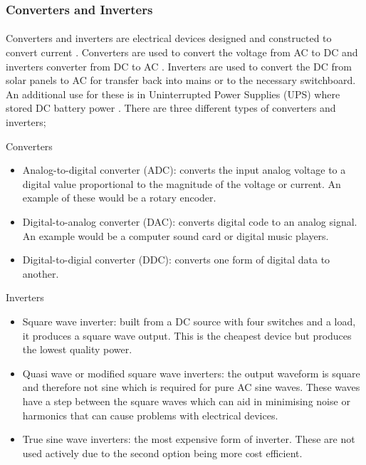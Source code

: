 \subsubsection{Converters and Inverters}

\paragraph{}
Converters and inverters are electrical devices designed and constructed to convert
current \cite{website:ConvVsInverter}. Converters are used to convert the voltage from AC to DC and inverters converter from DC to AC \cite{website:ConvVsInverter}. Inverters are used to convert the DC from solar panels to AC for transfer back into mains or to the necessary switchboard. An additional use for these is in Uninterrupted Power Supplies (UPS) where stored DC battery power \cite{website:ConvVsInverter}. There are three different types of converters and inverters;

Converters \cite{website:ConvVsInverter}
\begin{itemize}[noitemsep]
\item Analog-to-digital converter (ADC): converts the input analog voltage to a digital
value proportional to the magnitude of the voltage or current. An example of these
would be a rotary encoder.
\item Digital-to-analog converter (DAC): converts digital code to an analog signal. An
example would be a computer sound card or digital music players.
\item Digital-to-digial converter (DDC): converts one form of digital data to another.
\end{itemize}

Inverters \cite{website:ConvVsInverter}
\begin{itemize}[noitemsep]
\item Square wave inverter: built from a DC source with four switches and a load, it
produces a square wave output. This is the cheapest device but produces the
lowest quality power.
\item Quasi wave or modified square wave inverters: the output waveform is square and
therefore not sine which is required for pure AC sine waves. These waves have
a step between the square waves which can aid in minimising noise or harmonics
that can cause problems with electrical devices.
\item  True sine wave inverters: the most expensive form of inverter. These are not used
actively due to the second option being more cost efficient.
\end{itemize}

